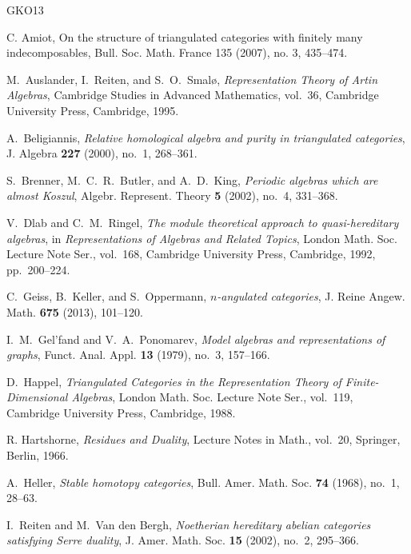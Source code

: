 \documentclass[a4paper,reqno,10pt]{amsart}
\numberwithin{equation}{section}
\begin{document}
\begin{thebibliography}{GKO13}

 C. Amiot, On the structure of triangulated categories with finitely many indecomposables, Bull. Soc. Math. France 135 (2007), no. 3, 435–474.

M.~Auslander, I.~Reiten, and S.~O.~Smal{\o},
\emph{Representation Theory of Artin Algebras},
Cambridge Studies in Advanced Mathematics, vol.~36,
Cambridge University Press, Cambridge, 1995.

A.~Beligiannis,
\emph{Relative homological algebra and purity in triangulated categories},
J. Algebra \textbf{227} (2000), no.~1, 268--361.

S.~Brenner, M.~C.~R.~Butler, and A.~D.~King,
\emph{Periodic algebras which are almost Koszul},
Algebr. Represent. Theory \textbf{5} (2002), no.~4, 331--368.

V.~Dlab and C.~M.~Ringel,
\emph{The module theoretical approach to quasi-hereditary algebras},
in \emph{Representations of Algebras and Related Topics},
London Math. Soc. Lecture Note Ser., vol.~168,
Cambridge University Press, Cambridge, 1992, pp.~200--224.

C.~Geiss, B.~Keller, and S.~Oppermann,
\emph{$n$-angulated categories},
J. Reine Angew. Math. \textbf{675} (2013), 101--120.

I.~M.~Gel'fand and V.~A.~Ponomarev,
\emph{Model algebras and representations of graphs},
Funct. Anal. Appl. \textbf{13} (1979), no.~3, 157--166.




D.~Happel,
\emph{Triangulated Categories in the Representation Theory of
Finite-Dimensional Algebras},
London Math. Soc. Lecture Note Ser., vol.~119,
Cambridge University Press, Cambridge, 1988.


R. Hartshorne,
\emph{Residues and Duality},
 Lecture Notes in Math., vol.~20,
Springer, Berlin, 1966.

A.~Heller,
\emph{Stable homotopy categories},
Bull. Amer. Math. Soc. \textbf{74} (1968), no.~1, 28--63.



I.~Reiten and M.~Van den Bergh,
\emph{Noetherian hereditary abelian categories satisfying Serre duality},
J. Amer. Math. Soc. \textbf{15} (2002), no.~2, 295--366.


\end{thebibliography}
\end{document}
